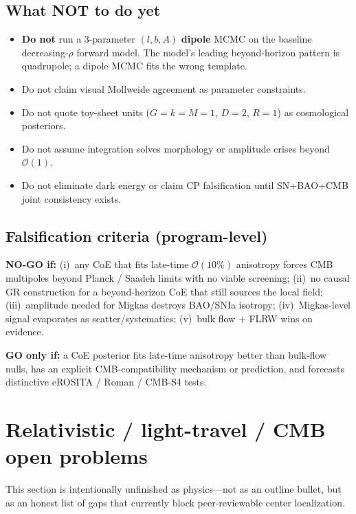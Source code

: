 \documentclass[11pt,a4paper]{article}
\begin{document}
\subsection{What NOT to do yet}

\begin{itemize}
\item \textbf{Do not} run a 3-parameter \((l,b,A)\) \textbf{dipole} MCMC on the baseline decreasing-\(\rho\) forward model. The model's leading beyond-horizon pattern is quadrupole; a dipole MCMC fits the wrong template.
\item Do not claim visual Mollweide agreement as parameter constraints.
\item Do not quote toy-sheet units (\(G=k=M=1\), \(D=2\), \(R=1\)) as cosmological posteriors.
\item Do not assume integration solves morphology or amplitude crises beyond \(\mathcal{O}(1)\).
\item Do not eliminate dark energy or claim CP falsification until SN+BAO+CMB joint consistency exists.
\end{itemize}

\subsection{Falsification criteria (program-level)}

\textbf{NO-GO if:} (i)~any CoE that fits late-time \(\mathcal{O}(10\%)\) anisotropy forces CMB multipoles beyond Planck / Saadeh limits with no viable screening; (ii)~no causal GR construction for a beyond-horizon CoE that still sources the local field; (iii)~amplitude needed for Migkas destroys BAO/SNIa isotropy; (iv)~Migkas-level signal evaporates as scatter/systematics; (v)~bulk flow + FLRW wins on evidence.

\textbf{GO only if:} a CoE posterior fits late-time anisotropy better than bulk-flow nulls, has an explicit CMB-compatibility mechanism or prediction, and forecasts distinctive eROSITA / Roman / CMB-S4 tests.

\section{Relativistic / light-travel / CMB open problems}

This section is intentionally unfinished as physics---not as an outline bullet, but as an honest list of gaps that currently block peer-reviewable center localization.
\end{document}
